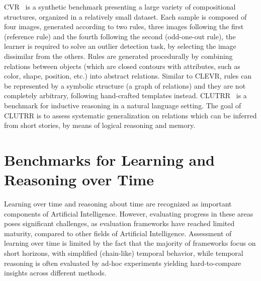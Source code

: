 CVR~\cite{zerroug2022benchmark} is a synthetic benchmark presenting a large variety of compositional structures, organized in a relatively small dataset.
Each sample is composed of four images, generated according to two rules, three images following the first (reference rule) and the fourth following the second (odd-one-out rule), the learner is required to solve an outlier detection task, by selecting the image dissimilar from the others.
Rules are generated procedurally by combining relations between objects (which are closed contours with attributes, such as color, shape, position, etc.) into abstract relations.
Similar to CLEVR, rules can be represented by a symbolic structure (a graph of relations) and they are not completely arbitrary, following hand-crafted templates instead.
CLUTRR~\cite{sinha2019clutrr} is a benchmark for inductive reasoning in a natural language setting. The goal of CLUTRR is to assess systematic generalization on relations which can be inferred from short stories, by means of logical reasoning and memory. %

\section{Benchmarks for Learning and Reasoning over Time}
Learning over time and reasoning about time are recognized as important components of Artificial Intelligence. However, evaluating progress in these areas poses significant challenges, as evaluation frameworks have reached limited maturity, compared to other fields of Artificial Intelligence. Assessment of learning over time is limited by the fact that the majority of frameworks focus on short horizons, with simplified (chain-like) temporal behavior, while temporal reasoning is often evaluated by ad-hoc experiments yielding hard-to-compare insights across different methods.

